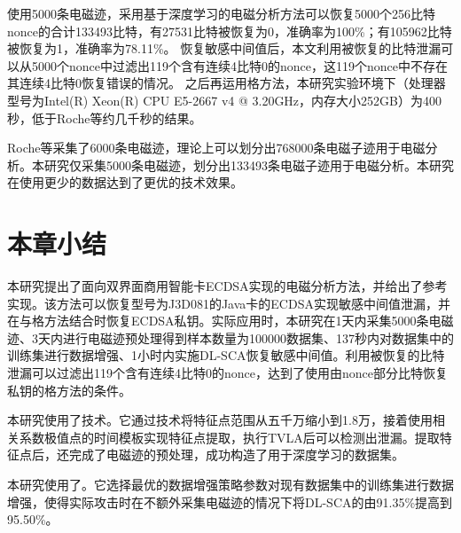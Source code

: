 {{{	使用5000条电磁迹，采用基于深度学习的电磁分析方法可以恢复5000个256比特nonce的合计133493比特，有27531比特被恢复为0，准确率为100\%；有105962比特被恢复为1，准确率为78.11\%。
	恢复敏感中间值后，本文利用被恢复的比特泄漏可以从5000个nonce中过滤出119个含有连续4比特0的nonce，这119个nonce中不存在其连续4比特0恢复错误的情况。
	之后再运用格方法，本研究实验环境下（处理器型号为Intel(R) Xeon(R) CPU E5-2667 v4 @ 3.20GHz，内存大小252GB）为400秒，低于Roche等\citep{Roche21}约几千秒的结果。
	
	Roche等\citep{Roche21}采集了6000条电磁迹，理论上可以划分出768000条电磁子迹用于电磁分析。本研究仅采集5000条电磁迹，划分出133493条电磁子迹用于电磁分析。本研究在使用更少的数据达到了更优的技术效果。
	
	}

	\section{本章小结}
	{\color{\xchange}
	
%	
	本研究提出了面向双界面商用智能卡ECDSA实现的电磁分析方法，并给出了参考实现。该方法可以恢复型号为J3D081的Java卡的ECDSA实现敏感中间值泄漏，并在与格方法结合时恢复ECDSA私钥。实际应用时，本研究在1天内采集5000条电磁迹、3天内进行电磁迹预处理得到样本数量为100000数据集、137秒内对数据集中的训练集进行数据增强、1小时内实施DL-SCA恢复敏感中间值。利用被恢复的比特泄漏可以过滤出119个含有连续4比特0的nonce，达到了使用由nonce部分比特恢复私钥的格方法的条件。
	
	本研究使用了\yuchuli 技术。它通过\poifanwei 技术将特征点范围从五千万缩小到1.8万，接着使用相关系数极值点的时间模板实现特征点提取，执行TVLA后可以检测出泄漏。提取特征点后，还完成了电磁迹的预处理，成功构造了用于深度学习的数据集。
	
	本研究使用了\shujuzengqiang。它选择最优的数据增强策略参数对现有数据集中的训练集进行数据增强，使得实际攻击时在不额外采集电磁迹的情况下将DL-SCA的\zyx 由91.35\%提高到95.50\%。
	
}}}
